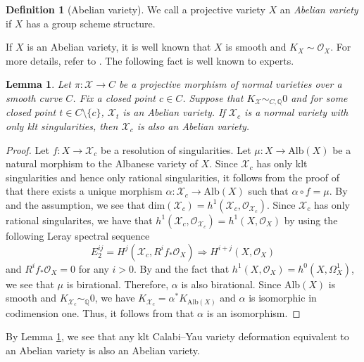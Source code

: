 \documentclass[12pt,twoside]{amsart}
\newtheorem{lem}[thm]{Lemma}
\theoremstyle{definition}
\newtheorem{defn}[thm]{Definition}
\begin{document}
\begin{defn}[Abelian variety]
We call a projective variety $X$ an {\em Abelian variety} if $X$ has a group scheme structure.
\end{defn}
If $X$ is an Abelian variety, it is well known that $X$ is smooth and $K_X\sim\mathcal{O}_X$.
For more details, refer to \cite{Ab}.
The following fact is well known to experts.

\begin{lem}\label{lem--deformation--invariant--abelian}
    Let $\pi\colon\mathcal{X}\to C$ be a projective morphism of normal varieties over a smooth curve $C$.
    Fix a closed point $c\in C$.
    Suppose that $K_{\mathcal{X}}\sim_{C,\mathbb{Q}}0$ and for some closed point $t\in C\setminus\{c\}$, $\mathcal{X}_t$ is an Abelian variety.
If $\mathcal{X}_c$ is a normal variety with only klt singularities, then $\mathcal{X}_c$ is also an Abelian variety.
\end{lem}

\begin{proof}
Let $f\colon X\to\mathcal{X}_c$ be a resolution of singularities. 
Let $\mu\colon X\to \mathrm{Alb}(X)$ be a natural morphism to the Albanese variety of $X$.
    Since $\mathcal{X}_c$ has only klt singularities and hence only rational singularities, it follows from the proof of \cite[Lemma 8.1]{kawamata} that there exists a unique morphism $\alpha\colon \mathcal{X}_c\to \mathrm{Alb}(X)$ such that $\alpha\circ f=\mu$.
    By \cite[Corollary 2.64]{kollar-moduli} and the assumption, we see that $\mathrm{dim}(\mathcal{X}_c)=h^1(\mathcal{X}_c,\mathcal{O}_{\mathcal{X}_c})$.
    Since $\mathcal{X}_c$ has only rational singularites, we have that $h^1(\mathcal{X}_c,\mathcal{O}_{\mathcal{X}_c})=h^1(X,\mathcal{O}_{X})$ by using the following Leray spectral sequence
    \[
    E_2^{ij}=H^j(\mathcal{X}_c,R^if_*\mathcal{O}_{X})\Rightarrow H^{i+j}(X,\mathcal{O}_{X})
    \]
    and $R^if_*\mathcal{O}_{X}=0$ for any $i>0$.
    By \cite[Corollary 2]{kawamata-chara} and the fact that $h^1(X,\mathcal{O}_{X})=h^0(X,\Omega_X^1)$, we see that $\mu$ is birational.
    Therefore, $\alpha$ is also birational.
    Since $\mathrm{Alb}(X)$ is smooth and $K_{\mathcal{X}_c}\sim_{\mathbb{Q}}0$, we have $K_{\mathcal{X}_c}=\alpha^*K_{\mathrm{Alb}(X)}$ and $\alpha$ is isomorphic in codimension one.
    Thus, it follows from \cite[Lemma 2.62]{KM} that $\alpha$ is an isomorphism.
\end{proof}

By Lemma \ref{lem--deformation--invariant--abelian}, we see that any klt Calabi--Yau variety deformation equivalent to an Abelian variety is also an Abelian variety.
\end{document}
